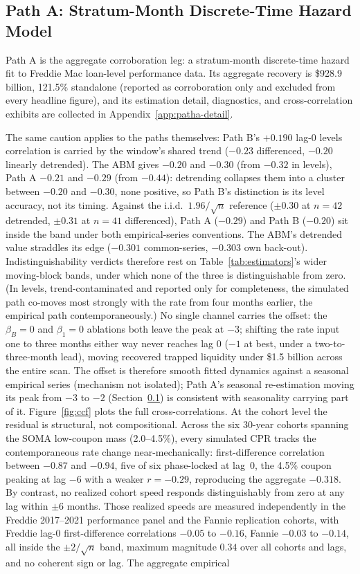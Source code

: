 \documentclass[12pt]{article}
\begin{document}
\subsection{Path A: Stratum-Month Discrete-Time Hazard Model}\label{sec:patha}

Path A is the aggregate corroboration leg: a stratum-month discrete-time hazard fit to Freddie Mac loan-level performance data. Its aggregate recovery is \$928.9 billion, 121.5\% standalone (reported as corroboration only and excluded from every headline figure), and its estimation detail, diagnostics, and cross-correlation exhibits are collected in Appendix~\ref{app:patha-detail}.

The same caution applies to the paths themselves: Path B's $+0.190$ lag-0 levels correlation is carried by the window's shared trend ($-0.23$ differenced, $-0.20$ linearly detrended). The ABM gives $-0.20$ and $-0.30$ (from $-0.32$ in levels), Path A $-0.21$ and $-0.29$ (from $-0.44$): detrending collapses them into a cluster between $-0.20$ and $-0.30$, none positive, so Path B's distinction is its level accuracy, not its timing. Against the i.i.d.\ $1.96/\sqrt{n}$ reference ($\pm 0.30$ at $n = 42$ detrended, $\pm 0.31$ at $n = 41$ differenced), Path A ($-0.29$) and Path B ($-0.20$) sit inside the band under both empirical-series conventions. The ABM's detrended value straddles its edge ($-0.301$ common-series, $-0.303$ own back-out). Indistinguishability verdicts therefore rest on Table~\ref{tab:estimators}'s wider moving-block bands, under which none of the three is distinguishable from zero. (In levels, trend-contaminated and reported only for completeness, the simulated path co-moves most strongly with the rate from four months earlier, the empirical path contemporaneously.) No single channel carries the offset: the $\beta_B = 0$ and $\beta_1 = 0$ ablations both leave the peak at $-3$; shifting the rate input one to three months either way never reaches lag 0 ($-1$ at best, under a two-to-three-month lead), moving recovered trapped liquidity under \$1.5 billion across the entire scan. The offset is therefore smooth fitted dynamics against a seasonal empirical series (mechanism not isolated); Path A's seasonal re-estimation moving its peak from $-3$ to $-2$ (Section~\ref{sec:patha}) is consistent with seasonality carrying part of it. Figure~\ref{fig:ccf} plots the full cross-correlations. At the cohort level the residual is structural, not compositional. Across the six 30-year cohorts spanning the SOMA low-coupon mass (2.0--4.5\%), every simulated CPR tracks the contemporaneous rate change near-mechanically: first-difference correlation between $-0.87$ and $-0.94$, five of six phase-locked at lag~0, the 4.5\% coupon peaking at lag $-6$ with a weaker $r=-0.29$, reproducing the aggregate $-0.318$. By contrast, no realized cohort speed responds distinguishably from zero at any lag within $\pm 6$ months. Those realized speeds are measured independently in the Freddie 2017--2021 performance panel and the Fannie replication cohorts, with Freddie lag-0 first-difference correlations $-0.05$ to $-0.16$, Fannie $-0.03$ to $-0.14$, all inside the $\pm 2/\sqrt{n}$ band, maximum magnitude $0.34$ over all cohorts and lags, and no coherent sign or lag. The aggregate empirical 
\end{document}
